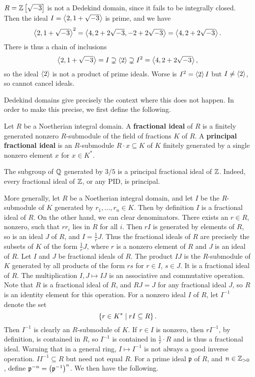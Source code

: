 \begin{example2}
$ R = \mathbb{Z}\left[ \sqrt{-3} \right] $ is not a Dedekind domain, since it fails to be integrally closed. Then the ideal $ I = \left\langle 2, 1 + \sqrt{-3} \right\rangle $ is prime, and we have
$$ \left\langle 2, 1 + \sqrt{-3} \right\rangle^2 = \left\langle 4, 2 + 2\sqrt{-3}, -2 + 2\sqrt{-3} \right\rangle = \left\langle 4, 2 + 2\sqrt{-3} \right\rangle. $$
There is thus a chain of inclusions
$$ \left\langle 2, 1 + \sqrt{-3} \right\rangle = I \supsetneq \left\langle 2 \right\rangle \supsetneq I^2 = \left\langle 4, 2 + 2\sqrt{-3} \right\rangle, $$
so the ideal $ \left\langle 2 \right\rangle $ is not a product of prime ideals. Worse is $ I^2 = \left\langle 2 \right\rangle I $ but $ I \ne \left\langle 2 \right\rangle $, so cannot cancel ideals.
\end{example2}

Dedekind domains give precisely the context where this does not happen. In order to make this precise, we first define the following.

\begin{definition}
Let $ R $ be a Noetherian integral domain. A \textbf{fractional ideal} of $ R $ is a finitely generated nonzero $ R $-submodule of the field of fractions $ K $ of $ R $. A \textbf{principal fractional ideal} is an $ R $-submodule $ R \cdot x \subseteq K $ of $ K $ finitely generated by a single nonzero element $ x $ for $ x \in K^* $.
\end{definition}

\begin{example2}
The subgroup of $ \mathbb{Q} $ generated by $ 3 / 5 $ is a principal fractional ideal of $ \mathbb{Z} $. Indeed, every fractional ideal of $ \mathbb{Z} $, or any PID, is principal.
\end{example2}

More generally, let $ R $ be a Noetherian integral domain, and let $ I $ be the $ R $-submodule of $ K $ generated by $ r_1, \dots, r_n \in K $. Then by definition $ I $ is a fractional ideal of $ R $. On the other hand, we can clear denominators. There exists an $ r \in R $, nonzero, such that $ rr_i $ lies in $ R $ for all $ i $. Then $ rI $ is generated by elements of $ R $, so is an ideal $ J $ of $ R $, and $ I = \tfrac{1}{r}J $. Thus the fractional ideals of $ R $ are precisely the subsets of $ K $ of the form $ \tfrac{1}{r}J $, where $ r $ is a nonzero element of $ R $ and $ J $ is an ideal of $ R $. Let $ I $ and $ J $ be fractional ideals of $ R $. The product $ IJ $ is the $ R $-submodule of $ K $ generated by all products of the form $ rs $ for $ r \in I $, $ s \in J $. It is a fractional ideal of $ R $. The multiplication $ I, J \mapsto IJ $ is an associative and commutative operation. Note that $ R $ is a fractional ideal of $ R $, and $ RJ = J $ for any fractional ideal $ J $, so $ R $ is an identity element for this operation. For a nonzero ideal $ I $ of $ R $, let $ I^{-1} $ denote the set
$$ \left\{ r \in K^* \mid rI \subseteq R \right\}. $$
Then $ I^{-1} $ is clearly an $ R $-submodule of $ K $. If $ r \in I $ is nonzero, then $ rI^{-1} $, by definition, is contained in $ R $, so $ I^{-1} $ is contained in $ \tfrac{1}{r} \cdot R $ and is thus a fractional ideal. Warning that in a general ring, $ I \mapsto I^{-1} $ is not always a good inverse operation. $ II^{-1} \subseteq R $ but need not equal $ R $. For a prime ideal $ \mathfrak{p} $ of $ R $, and $ n \in \mathbb{Z}_{> 0} $, define $ \mathfrak{p}^{-n} = \left( \mathfrak{p}^{-1} \right)^n $. We then have the following.

